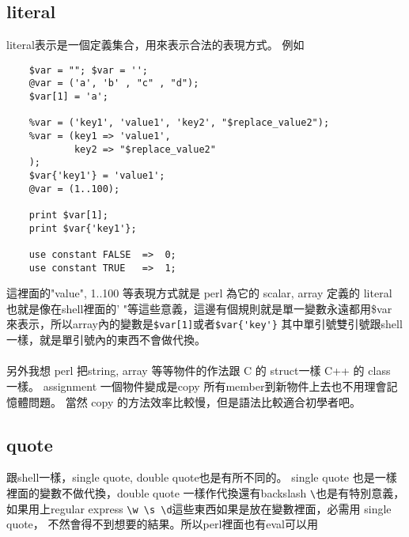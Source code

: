     \subsection{literal}
    literal表示是一個定義集合，用來表示合法的表現方式。
    例如
    \begin{verbatim}
    $var = ""; $var = '';
    @var = ('a', 'b' , "c" , "d");
    $var[1] = 'a';

    %var = ('key1', 'value1', 'key2', "$replace_value2");
    %var = (key1 => 'value1', 
            key2 => "$replace_value2"
    );
    $var{'key1'} = 'value1';
    @var = (1..100);

    print $var[1];
    print $var{'key1'};

    use constant FALSE	=>	0;
    use constant TRUE	=>	1;

    \end{verbatim}
    這裡面的"value", 1..100 等表現方式就是 perl 為它的 scalar, array 定義的 literal
    也就是像在shell裡面的' "等這些意義，這邊有個規則就是單一變數永遠都用\$var
    來表示，所以array內的變數是\verb=$var[1]=或者\verb=$var{'key'}=
    其中單引號雙引號跟shell一樣，就是單引號內的東西不會做代換。\\\\另外我想
    perl 把string, array 等等物件的作法跟 C 的 struct一樣 C++ 的 class 一樣。
    assignment 一個物件變成是copy 所有member到新物件上去也不用理會記憶體問題。
    當然 copy 的方法效率比較慢，但是語法比較適合初學者吧。

    \subsection{quote}
    跟shell一樣，single quote, double quote也是有所不同的。
    single quote 也是一樣裡面的變數不做代換，double quote 一樣作代換還有backslash
    \verb=\=也是有特別意義，如果用上regular express 
    \verb=\w \s \d=這些東西如果是放在變數裡面，必需用 single quote，
    不然會得不到想要的結果。所以perl裡面也有eval可以用

